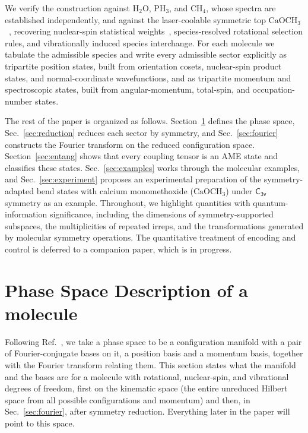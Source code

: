 \documentclass[
  reprint,
  aps,
  prx,
  superscriptaddress,
  amsmath,
  amssymb,
  longbibliography
]{revtex4-2}
\newcommand{\grp}[1]{\mathsf{#1}}
\begin{document}
We verify the construction against \(\mathrm{H_2O}\), \(\mathrm{PH_3}\), and \(\mathrm{CH_4}\), whose spectra are established independently, and against the laser-coolable symmetric top \(\mathrm{CaOCH_3}\)~\cite{Mitra2020}, recovering nuclear-spin statistical weights~\cite{Wilson1935, Schmiedt2016, KubischtaTeixeira2026}, species-resolved rotational selection rules, and vibrationally induced species interchange. For each molecule we tabulate the admissible species and write every admissible sector explicitly as tripartite position states, built from orientation cosets, nuclear-spin product states, and normal-coordinate wavefunctions, and as tripartite momentum and spectroscopic states, built from angular-momentum, total-spin, and occupation-number states. 

The rest of the paper is organized as follows. Section~\ref{sec:phasespace} defines the phase space, Sec.~\ref{sec:reduction} reduces each sector by symmetry, and Sec.~\ref{sec:fourier} constructs the Fourier transform on the reduced configuration space. Section~\ref{sec:entang} shows that every coupling tensor is an AME state and classifies these states. Sec.~\ref{sec:examples} works through the molecular examples, and Sec.~\ref{sec:experiment} proposes an experimental preparation of the symmetry-adapted bend states with calcium monomethoxide ($\mathrm{CaOCH_3}$) under $\grp{C_{3v}}$ symmetry as an example. Throughout, we highlight quantities with quantum-information significance, including the dimensions of symmetry-supported subspaces, the multiplicities of repeated irreps, and the transformations generated by molecular symmetry operations. The quantitative treatment of encoding and control is deferred to a companion paper, which is in progress.
















\section{Phase Space Description of a molecule}
\label{sec:phasespace}



Following Ref.~\cite{albert2025quantumtheorymolecularorientations}, we take a phase space to be a configuration manifold with a pair of Fourier-conjugate bases on it, a position basis and a momentum basis, together with the Fourier transform relating them.  
This section states what the manifold and the bases are for a molecule with rotational, nuclear-spin, and vibrational degrees of freedom, first on the kinematic space (the entire unreduced Hilbert space from all possible configurations and momentum) and then, in Sec.~\ref{sec:fourier}, after symmetry reduction. Everything later in the paper will point to this space.
\end{document}
